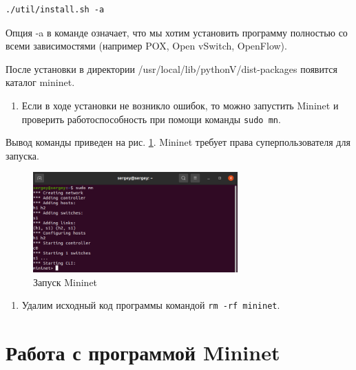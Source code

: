 \documentclass[
  13pt,
  fontsize=13pt,
  russian,
  a4paper,
,captions=tableheading
]{scrreprt}
\providecommand{\tightlist}{%
  \setlength{\itemsep}{0pt}\setlength{\parskip}{0pt}}
\begin{document}
\begin{verbatim}
./util/install.sh -a
\end{verbatim}

Опция -a в команде означает, что мы хотим установить программу полностью
со всеми зависимостями (например POX, Open vSwitch, OpenFlow).

После установки в директории /usr/local/lib/pythonV/dist-packages
появится каталог mininet.

\begin{enumerate}
\def\labelenumi{\arabic{enumi}.}
\setcounter{enumi}{4}
\tightlist
\item
  Если в ходе установки не возникло ошибок, то можно запустить Mininet и
  проверить работоспособность при помощи команды
  \texttt{sudo mn}.
\end{enumerate}

Вывод команды приведен на рис. \ref{fig:0001}. Mininet требует права
суперпользователя для запуска.

\begin{figure}
\hypertarget{fig:0001}{%
\centering
\includegraphics[width=0.7\textwidth,height=\textheight]{mininet_1.5.png}
\caption{Запуск Mininet}\label{fig:0001}
}
\end{figure}

\begin{enumerate}
\def\labelenumi{\arabic{enumi}.}
\setcounter{enumi}{5}
\tightlist
\item
  Удалим исходный код программы командой
  \texttt{rm -rf mininet}.
\end{enumerate}

\hypertarget{ux440ux430ux431ux43eux442ux430-ux441-ux43fux440ux43eux433ux440ux430ux43cux43cux43eux439-mininet}{%
\section{Работа с программой
Mininet}\label{ux440ux430ux431ux43eux442ux430-ux441-ux43fux440ux43eux433ux440ux430ux43cux43cux43eux439-mininet}}
\end{document}

